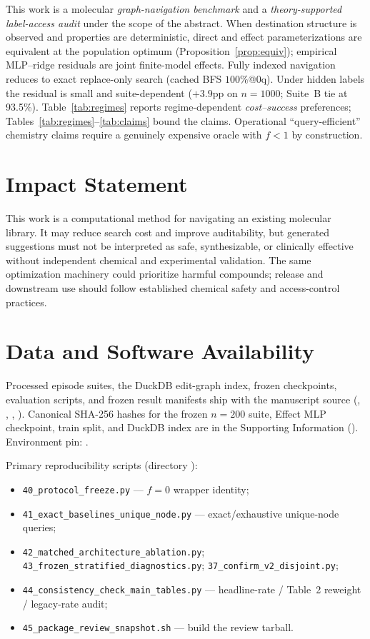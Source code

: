 \documentclass[journal=jcisd8,manuscript=article,email=false]{achemso}
\begin{document}
This work is a molecular \emph{graph-navigation benchmark} and a \emph{theory-supported label-access audit} under the scope of the abstract. When destination structure is observed and properties are deterministic, direct and effect parameterizations are equivalent at the population optimum (Proposition~\ref{prop:equiv}); empirical MLP--ridge residuals are joint finite-model effects. Fully indexed navigation reduces to exact replace-only search (cached BFS $100\%$@$0$q). Under hidden labels the residual is small and suite-dependent ($+3.9$pp on $n{=}1000$; Suite~B tie at 93.5\%). Table~\ref{tab:regimes} reports regime-dependent \emph{cost--success} preferences; Tables~\ref{tab:regimes}--\ref{tab:claims} bound the claims. Operational ``query-efficient'' chemistry claims require a genuinely expensive oracle with $f{<}1$ by construction.

\section*{Impact Statement}

This work is a computational method for navigating an existing molecular library. It may reduce search cost and improve auditability, but generated suggestions must not be interpreted as safe, synthesizable, or clinically effective without independent chemical and experimental validation. The same optimization machinery could prioritize harmful compounds; release and downstream use should follow established chemical safety and access-control practices.

\section*{Data and Software Availability}
Processed episode suites, the DuckDB edit-graph index, frozen checkpoints, evaluation scripts, and frozen result manifests ship with the manuscript source (, , , ). Canonical SHA-256 hashes for the frozen $n{=}200$ suite, Effect MLP checkpoint, train split, and DuckDB index are in the Supporting Information (). Environment pin: .

Primary reproducibility scripts (directory ):
\begin{itemize}
  \item \texttt{40\_protocol\_freeze.py} --- $f{=}0$ wrapper identity;
  \item \texttt{41\_exact\_baselines\_unique\_node.py} --- exact/exhaustive unique-node queries;
  \item \texttt{42\_matched\_architecture\_ablation.py};\\
        \texttt{43\_frozen\_stratified\_diagnostics.py}; \texttt{37\_confirm\_v2\_disjoint.py};
  \item \texttt{44\_consistency\_check\_main\_tables.py} --- headline-rate / Table~2 reweight / legacy-rate audit;
  \item \texttt{45\_package\_review\_snapshot.sh} --- build the review tarball.
\end{itemize}
\end{document}
